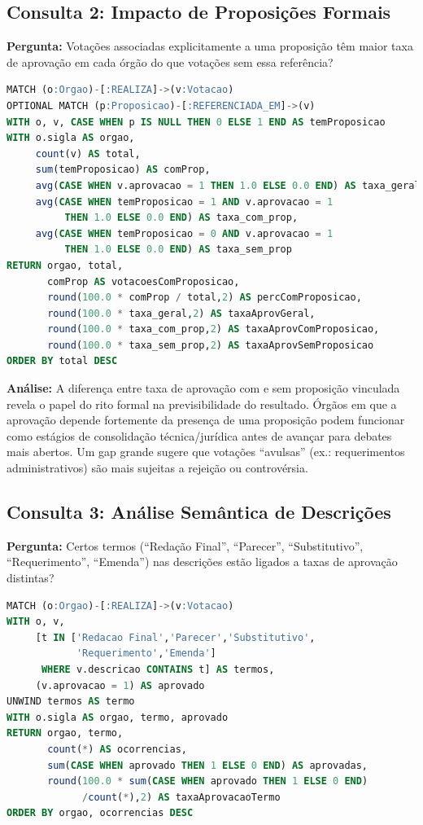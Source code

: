 \documentclass[12pt,a4paper]{article}
\begin{document}
\subsection{Consulta 2: Impacto de Proposições Formais}

\textbf{Pergunta:} Votações associadas explicitamente a uma proposição têm maior taxa de aprovação em cada órgão do que votações sem essa referência?

\begin{lstlisting}[language=SQL,caption=Consulta Cypher 2]
MATCH (o:Orgao)-[:REALIZA]->(v:Votacao)
OPTIONAL MATCH (p:Proposicao)-[:REFERENCIADA_EM]->(v)
WITH o, v, CASE WHEN p IS NULL THEN 0 ELSE 1 END AS temProposicao
WITH o.sigla AS orgao,
     count(v) AS total,
     sum(temProposicao) AS comProp,
     avg(CASE WHEN v.aprovacao = 1 THEN 1.0 ELSE 0.0 END) AS taxa_geral,
     avg(CASE WHEN temProposicao = 1 AND v.aprovacao = 1 
          THEN 1.0 ELSE 0.0 END) AS taxa_com_prop,
     avg(CASE WHEN temProposicao = 0 AND v.aprovacao = 1 
          THEN 1.0 ELSE 0.0 END) AS taxa_sem_prop
RETURN orgao, total,
       comProp AS votacoesComProposicao,
       round(100.0 * comProp / total,2) AS percComProposicao,
       round(100.0 * taxa_geral,2) AS taxaAprovGeral,
       round(100.0 * taxa_com_prop,2) AS taxaAprovComProposicao,
       round(100.0 * taxa_sem_prop,2) AS taxaAprovSemProposicao
ORDER BY total DESC
\end{lstlisting}

\textbf{Análise:} A diferença entre taxa de aprovação com e sem proposição vinculada revela o papel do rito formal na previsibilidade do resultado. Órgãos em que a aprovação depende fortemente da presença de uma proposição podem funcionar como estágios de consolidação técnica/jurídica antes de avançar para debates mais abertos. Um gap grande sugere que votações ``avulsas'' (ex.: requerimentos administrativos) são mais sujeitas a rejeição ou controvérsia.

\subsection{Consulta 3: Análise Semântica de Descrições}

\textbf{Pergunta:} Certos termos (``Redação Final'', ``Parecer'', ``Substitutivo'', ``Requerimento'', ``Emenda'') nas descrições estão ligados a taxas de aprovação distintas?

\begin{lstlisting}[language=SQL,caption=Consulta Cypher 3]
MATCH (o:Orgao)-[:REALIZA]->(v:Votacao)
WITH o, v,
     [t IN ['Redacao Final','Parecer','Substitutivo',
            'Requerimento','Emenda'] 
      WHERE v.descricao CONTAINS t] AS termos,
     (v.aprovacao = 1) AS aprovado
UNWIND termos AS termo
WITH o.sigla AS orgao, termo, aprovado
RETURN orgao, termo,
       count(*) AS ocorrencias,
       sum(CASE WHEN aprovado THEN 1 ELSE 0 END) AS aprovadas,
       round(100.0 * sum(CASE WHEN aprovado THEN 1 ELSE 0 END)
             /count(*),2) AS taxaAprovacaoTermo
ORDER BY orgao, ocorrencias DESC
\end{lstlisting}
\end{document}
